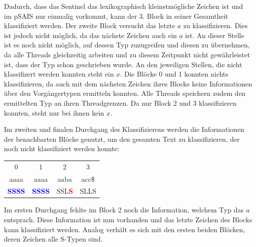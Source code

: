 Dadurch, dass das Sentinel das lexikographisch kleinstmögliche Zeichen ist und im pSAIS nur einmalig vorkommt, kann der 3. Block in seiner Gesamtheit klassifiziert werden. Der zweite Block versucht das letzte $a$ zu klassifizieren. Dies ist jedoch nicht möglich, da das nächste Zeichen auch ein $a$ ist. An dieser Stelle ist es noch nicht möglich, auf dessen Typ zuzugreifen und diesen zu übernehmen, da alle Threads gleichzeitig arbeiten und zu diesem Zeitpunkt nicht gewährleistet ist, dass der Typ schon geschrieben wurde. An den jeweiligen Stellen, die nicht klassifizert werden konnten steht ein $x$. Die Blöcke 0 und 1 konnten nichts klassifizieren, da auch mit dem nächsten Zeichen ihres Blocks keine Informationen über den Vorgängertypen ermitteln konnten. Alle Threads speichern zudem den ermittelten Typ an ihren Threadgrenzen. Da nur Block 2 und 3 klassifizieren konnten, steht nur bei ihnen kein $x$.

Im zweiten und finalen Durchgang des Klassifizierens werden die Informationen der benachbarten Blöcke genutzt, um den gesamten Text zu klassifizieren, der noch nicht klassifiziert werden konnte:

\begin{center}
	\begin{tabular}{c|c|c|c}      
		           0     	&             1         &           2           &             3    \\ 
          	aaaa     		&          aaaa         &        aaba           &          acc\$    \\            
\textbf{\textcolor{blue}{S}}\textbf{\textcolor{blue}{S}}\textbf{\textcolor{blue}{S}}\textbf{\textcolor{blue}{S}} &  \textbf{\textcolor{blue}{S}}\textbf{\textcolor{blue}{S}}\textbf{\textcolor{blue}{S}}\textbf{\textcolor{blue}{S}} & SSL\textbf{\textcolor{red}{S}}  & SLLS     \\             	       
	\end{tabular}
\end{center}

Im ersten Durchgang fehlte im Block 2 noch die Information, welchem Typ das $a$ entsprach. Diese Information ist nun vorhanden und das letzte Zeichen des Blocks kann klassifiziert werden. Analog verhält es sich mit den ersten beiden Blöcken, deren Zeichen alle S-Typen sind.


